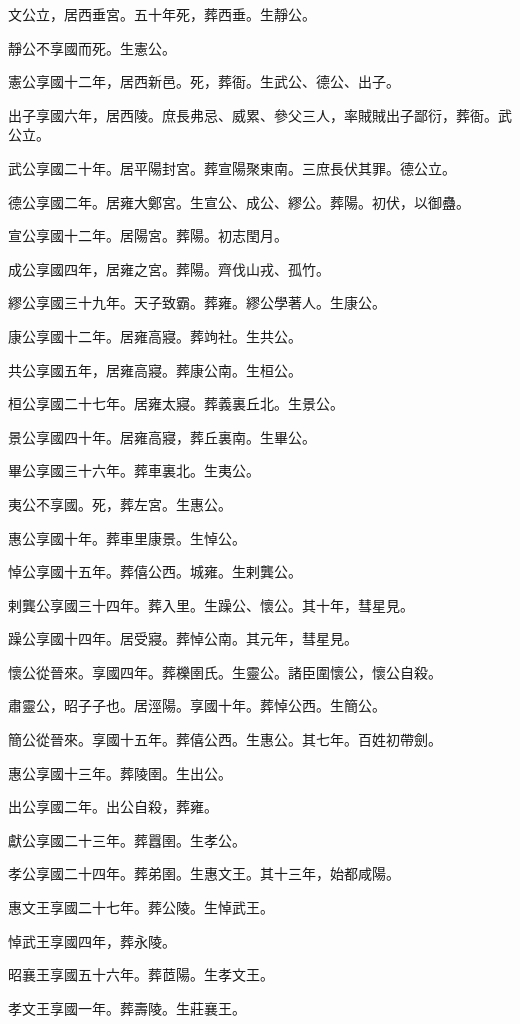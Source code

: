 文公立，居西垂宮。五十年死，葬西垂。生靜公。

靜公不享國而死。生憲公。

憲公享國十二年，居西新邑。死，葬衙。生武公、德公、出子。

出子享國六年，居西陵。庶長弗忌、威累、參父三人，率賊賊出子鄙衍，葬衙。武公立。

武公享國二十年。居平陽封宮。葬宣陽聚東南。三庶長伏其罪。德公立。

德公享國二年。居雍大鄭宮。生宣公、成公、繆公。葬陽。初伏，以御蠱。

宣公享國十二年。居陽宮。葬陽。初志閏月。

成公享國四年，居雍之宮。葬陽。齊伐山戎、孤竹。

繆公享國三十九年。天子致霸。葬雍。繆公學著人。生康公。

康公享國十二年。居雍高寢。葬竘社。生共公。

共公享國五年，居雍高寢。葬康公南。生桓公。

桓公享國二十七年。居雍太寢。葬義裏丘北。生景公。

景公享國四十年。居雍高寢，葬丘裏南。生畢公。

畢公享國三十六年。葬車裏北。生夷公。

夷公不享國。死，葬左宮。生惠公。

惠公享國十年。葬車里康景。生悼公。

悼公享國十五年。葬僖公西。城雍。生剌龔公。

剌龔公享國三十四年。葬入里。生躁公、懷公。其十年，彗星見。

躁公享國十四年。居受寢。葬悼公南。其元年，彗星見。

懷公從晉來。享國四年。葬櫟圉氏。生靈公。諸臣圍懷公，懷公自殺。

肅靈公，昭子子也。居涇陽。享國十年。葬悼公西。生簡公。

簡公從晉來。享國十五年。葬僖公西。生惠公。其七年。百姓初帶劍。

惠公享國十三年。葬陵圉。生出公。

出公享國二年。出公自殺，葬雍。

獻公享國二十三年。葬囂圉。生孝公。

孝公享國二十四年。葬弟圉。生惠文王。其十三年，始都咸陽。

惠文王享國二十七年。葬公陵。生悼武王。

悼武王享國四年，葬永陵。

昭襄王享國五十六年。葬茝陽。生孝文王。

孝文王享國一年。葬壽陵。生莊襄王。

